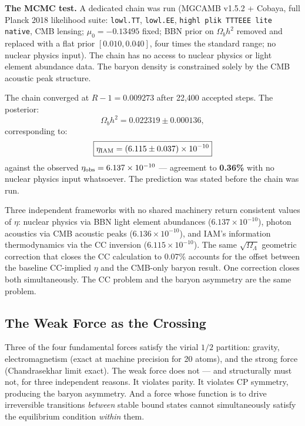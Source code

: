 \documentclass[12pt,a4paper]{article}
\begin{document}
\textbf{The MCMC test.} A dedicated chain was run (MGCAMB v1.5.2 + Cobaya,
full Planck 2018 likelihood suite: \texttt{lowl.TT}, \texttt{lowl.EE},
\texttt{highl plik TTTEEE lite native}, CMB lensing; $\mu_0 = -0.13495$ fixed;
BBN prior on $\Omega_b h^2$ removed and replaced with a flat prior
$[0.010, 0.040]$, four times the standard range; no nuclear physics input).
The chain has no access to nuclear physics or light element abundance data.
The baryon density is constrained solely by the CMB acoustic peak structure.

The chain converged at $R - 1 = 0.009273$ after 22,400 accepted steps.
The posterior:
\begin{equation}
\Omega_b h^2 = 0.022319 \pm 0.000136,
\end{equation}
corresponding to:
\begin{equation}
\boxed{\eta_{\rm IAM} = (6.115 \pm 0.037) \times 10^{-10}}
\end{equation}
against the observed $\eta_{\rm obs} = 6.137 \times 10^{-10}$ --- agreement to
\textbf{0.36\%} with no nuclear physics input whatsoever. The prediction was
stated before the chain was run.

Three independent frameworks with no shared machinery return consistent values
of $\eta$: nuclear physics via BBN light element abundances ($6.137 \times
10^{-10}$), photon acoustics via CMB acoustic peaks ($6.136 \times 10^{-10}$),
and IAM's information thermodynamics via the CC inversion ($6.115 \times
10^{-10}$). The same $\sqrt{\Omega_\Lambda}$ geometric correction that closes
the CC calculation to 0.07\% accounts for the offset between the baseline
CC-implied $\eta$ and the CMB-only baryon result. One correction closes both
simultaneously. The CC problem and the baryon asymmetry are the same problem.

\subsection{The Weak Force as the Crossing}

Three of the four fundamental forces satisfy the virial $1/2$ partition: gravity,
electromagnetism (exact at machine precision for 20 atoms), and the strong force
(Chandrasekhar limit exact). The weak force does not --- and structurally must
not, for three independent reasons. It violates parity. It violates CP symmetry,
producing the baryon asymmetry. And a force whose function is to drive
irreversible transitions \textit{between} stable bound states cannot simultaneously
satisfy the equilibrium condition \textit{within} them.
\end{document}
